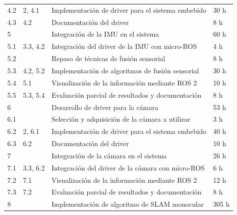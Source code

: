 \documentclass[
11pt, %
codirector, %
]{charter}
\begin{document}
\begin{table}[htpb]
\begin{tabular}{@{}llll@{}}
4.2             & 2, 4.1               & Implementación de driver para el sistema embebido  & 30 h               \\
4.3             & 4.2                  & Documentación del driver                           & 8 h                \\
5               &                      & Integración de la IMU en el sistema                & 60 h               \\
5.1             & 3.3, 4.2             & Integración del driver de la IMU con micro-ROS     & 4 h                \\
5.2             &                      & Repaso de técnicas de fusión sensorial             & 8 h                \\
5.3             & 4.2, 5.2             & Implementación de algoritmos de fusión sensorial   & 30 h               \\
5.4             & 5.1                  & Visualización de la información mediante ROS 2     & 10 h               \\
5.5             & 5.3, 5.4             & Evaluación parcial de resultados y documentación   & 8 h                \\
6               &                      & Desarrollo de driver para la cámara                & 53 h               \\
6.1             &                      & Selección y adquisición de la cámara a utilizar    & 3 h                \\
6.2             & 2, 6.1               & Implementación de driver para el sistema embebido  & 40 h               \\
6.3             & 6.2                  & Documentación del driver                           & 10 h               \\
7               &                      & Integración de la cámara en el sistema             & 26 h               \\
7.1             & 3.3, 6.2             & Integración del driver de la cámara con micro-ROS  & 6 h                \\
7.2             & 7.1                  & Visualización de la información mediante ROS 2     & 12 h               \\
7.3             & 7.2                  & Evaluación parcial de resultados y documentación   & 8 h                \\
8               &                      & Implementación de algoritmo de SLAM monocular      & 305 h              \\

\end{tabular}
\end{table}
\end{document}
